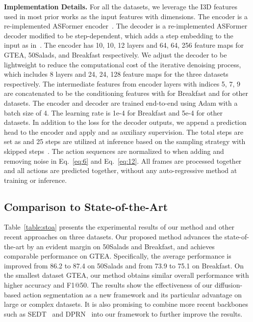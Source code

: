 \documentclass[10pt,twocolumn,letterpaper]{article}
\begin{document}
\textbf{Implementation Details.}
For all the datasets, we leverage the I3D features~\cite{I3D} used in most prior works as the input features  with  dimensions.
The encoder  is a re-implemented ASFormer encoder~\cite{2021_BMVC_Yi}.
The decoder  is a re-implemented ASFormer decoder modified to be step-dependent, which adds a step embedding to the input as in~\cite{DDPM}.
The encoder has 10, 10, 12 layers and 64, 64, 256 feature maps for GTEA, 50Salads, and Breakfast respectively.
We adjust the decoder to be lightweight to reduce the computational cost of the iterative denoising process, which includes 8 layers and 24, 24, 128 feature maps for the three datasets respectively.
The intermediate features from encoder layers with indices 5, 7, 9 are concatenated to be the conditioning features  with  for Breakfast and  for other datasets.
The encoder and decoder are trained end-to-end using Adam with a batch size of 4.
The learning rate is 1e-4 for Breakfast and 5e-4 for other datasets.
In addition to the loss  for the decoder outputs, we append a prediction head to the encoder and apply  and  as auxiliary supervision.
The total steps are set as  and 25 steps are utilized at inference based on the sampling strategy with skipped steps~\cite{DDIM}.
The action sequences are normalized to  when adding and removing noise in Eq.~\ref{eq:6} and Eq.~\ref{eq:12}.
All frames are processed together and all actions are predicted together, without any auto-regressive method at training or inference.




\subsection{Comparison to State-of-the-Art}

Table~\ref{table:stoa} presents the experimental results of our method and other recent approaches on three datasets.
Our proposed method advances the state-of-the-art by an evident margin on 50Salads and Breakfast, and achieves comparable performance on GTEA.
Specifically, the average performance is improved from 86.2 to 87.4 on 50Salads and from 73.9 to 75.1 on Breakfast.
On the smallest dataset GTEA, our method obtains similar overall performance with higher accuracy and F1@50.
The results show the effectiveness of our diffusion-based action segmentation as a new framework and its particular advantage on large or complex datasets.
It is also promising to combine more recent backbones such as SEDT~\cite{2022_EL_Kim} and DPRN~\cite{2022_PR_Park} into our framework to further improve the results.
\end{document}
